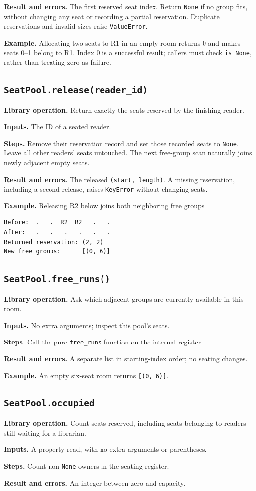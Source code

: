 \documentclass[11pt,a4paper]{article}
\newcommand{\routine}[2]{\subsection{\texorpdfstring{\texttt{#1}}{#2}}}
\newcommand{\librarymeaning}{\textbf{Library operation.} }
\newcommand{\arguments}{\textbf{Inputs.} }
\newcommand{\steps}{\textbf{Steps.} }
\newcommand{\result}{\textbf{Result and errors.} }
\newcommand{\example}{\textbf{Example.} }
\begin{document}
\result The first reserved seat index. Return \texttt{None} if no group
fits, without changing any seat or recording a partial reservation.
Duplicate reservations and invalid sizes raise \texttt{ValueError}.

\example Allocating two seats to R1 in an empty room returns 0 and makes
seats 0--1 belong to R1. Index 0 is a successful result; callers must check
\texttt{is None}, rather than treating zero as failure.

\routine{SeatPool.release(reader\_id)}{SeatPool release}
\librarymeaning Return exactly the seats reserved by the finishing reader.

\arguments The ID of a seated reader.

\steps Remove their reservation record and set those recorded seats to
\texttt{None}. Leave all other readers' seats untouched. The next free-group
scan naturally joins newly adjacent empty seats.

\result The released \texttt{(start, length)}. A missing reservation,
including a second release, raises \texttt{KeyError} without changing seats.

\example Releasing R2 below joins both neighboring free groups:
\begin{lstlisting}
Before:  .   .  R2  R2   .   .
After:   .   .   .   .   .   .
Returned reservation: (2, 2)
New free groups:      [(0, 6)]
\end{lstlisting}

\routine{SeatPool.free\_runs()}{SeatPool free runs}
\librarymeaning Ask which adjacent groups are currently available in this room.

\arguments No extra arguments; inspect this pool's seats.

\steps Call the pure \texttt{free\_runs} function on the internal register.

\result A separate list in starting-index order; no seating changes.

\example An empty six-seat room returns \texttt{[(0, 6)]}.

\routine{SeatPool.occupied}{SeatPool occupied property}
\librarymeaning Count seats reserved, including seats belonging to readers still
waiting for a librarian.

\arguments A property read, with no extra arguments or parentheses.

\steps Count non-\texttt{None} owners in the seating register.

\result An integer between zero and capacity.
\end{document}
